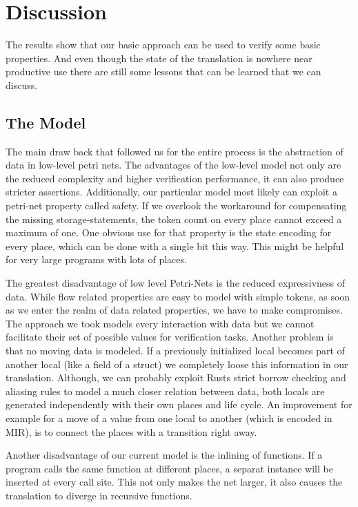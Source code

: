 \section{Discussion}
The results show that our basic approach can be used to verify some basic properties.
And even though the state of the translation is nowhere near productive use there are still some lessons that can be learned that we can discuss.
\subsection{The Model}
The main draw back that followed us for the entire process is the abstraction of data in low-level petri nets.
The advantages of the low-level model not only are the reduced complexity and higher verification performance, it can also produce stricter assertions.
Additionally, our particular model most likely can exploit a petri-net property called safety.
If we overlook the workaround for compensating the missing storage-statements, the token count on every place cannot exceed a maximum of one.
One obvious use for that property is the state encoding for every place, which can be done with a single bit this way.
This might be helpful for very large programs with lots of places.

The greatest disadvantage of low level Petri-Nets is the reduced expressivness of data.
While flow related properties are easy to model with simple tokens, as soon as we enter the realm of data related properties, we have to make compromises.
The approach we took models every interaction with data but we cannot facilitate their set of possible values for verification tasks.
Another problem is that no moving data is modeled.
If a previously initialized local becomes part of another local (like a field of a struct) we completely loose this information in our translation.
Although, we can probably exploit Rusts strict borrow checking and aliasing rules to model a much closer relation between data,
both locals are generated independently with their own places and life cycle.
An improvement for example for a move of a value from one local to another (which is encoded in MIR), is to connect the places with a transition right away.

Another disadvantage of our current model is the inlining of functions.
If a program calls the same function at different places, a separat instance will be inserted at every call site.
This not only makes the net larger, it also causes the translation to diverge in recursive functions.

